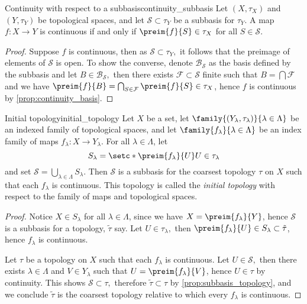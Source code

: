 \begin{proposition}{Continuity with respect to a subbasis}{continuity_subbasis}
    Let \((X, \tau_X)\) and \((Y,\tau_Y)\) be topological spaces, and let \(\mathcal{S} \subset \tau_Y\) be a subbasis for \(\tau_Y\). A map \(f : X \to Y\) is continuous if and only if \(\preim{f}{S} \in \tau_X\) for all \(S \in \mathcal{S}\).
\end{proposition}
\begin{proof}
    Suppose \(f\) is continuous, then as \(\mathcal{S} \subset \tau_Y,\) it follows that the preimage of elements of \(\mathcal{S}\) is open. To show the converse, denote \(\mathcal{B}_\mathcal{S}\) as the basis defined by the subbasis and let \(B \in \mathcal{B}_\mathcal{S},\) then there exists \(\mathcal{F} \subset \mathcal{S}\) finite such that \(B = \bigcap \mathcal{F}\) and we have \(\preim{f}{B} = \bigcap_{S \in \mathcal{F}}{\preim{f}{S}} \in \tau_X\), hence \(f\) is continuous by \cref{prop:continuity_basis}.
\end{proof}

\begin{proposition}{Initial topology}{initial_topology}
    Let \(X\) be a set, let \(\family{(Y_\lambda, \tau_\lambda)}{\lambda \in \Lambda}\) be an indexed family of topological spaces, and let \(\family{f_\lambda}{\lambda \in \Lambda}\) be an index family of maps \(f_\lambda : X \to Y_\lambda\). For all \(\lambda \in \Lambda\), let
    \begin{equation*}
        S_\lambda = \setc*{\preim{f_\lambda}{U}}{U \in \tau_\lambda}
    \end{equation*}
    and set \(\mathcal{S} = \bigcup_{\lambda \in \Lambda}{S_\lambda}\). Then \(\mathcal{S}\) is a subbasis for the coarsest topology \(\tau\) on \(X\) such that each \(f_\lambda\) is continuous. This topology is called the \emph{initial topology} with respect to the family of maps and topological spaces.
\end{proposition}
\begin{proof}
    Notice \(X \in S_\lambda\) for all \(\lambda \in \Lambda\), since we have \(X = \preim{f_\lambda}{Y}\), hence \(\mathcal{S}\) is a subbasis for a topology, \(\tilde{\tau}\) say. Let \(U \in \tau_\lambda,\) then \(\preim{f_\lambda}{U} \in S_\lambda \subset \tilde{\tau}\), hence \(f_\lambda\) is continuous.

    Let \(\tau\) be a topology on \(X\) such that each \(f_\lambda\) is continuous. Let \(U \in \mathcal{S},\) then there exists \(\lambda \in \Lambda\) and \(V \in Y_\lambda\) such that \(U = \preim{f_\lambda}{V}\), hence \(U \in \tau\) by continuity. This shows \(\mathcal{S} \subset \tau,\) therefore \(\tilde{\tau} \subset \tau\) by \cref{prop:subbasis_topology}, and we conclude \(\tilde{\tau}\) is the coarsest topology relative to which every \(f_\lambda\) is continuous.
\end{proof}

